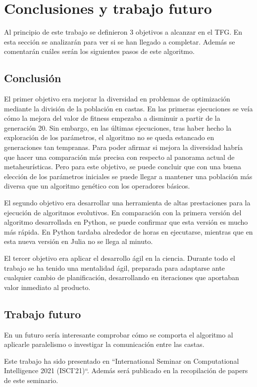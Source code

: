 \chapter{Conclusiones y trabajo futuro}

Al principio de este trabajo se definieron 3 objetivos a alcanzar en el TFG. En esta sección
se analizarán para ver si se han llegado a completar. Además se comentarán cuáles serán
los siguientes pasos de este algoritmo.

\section{Conclusión}

El primer objetivo era mejorar la diversidad en problemas de optimización mediante la división de la población en castas.
En las primeras ejecuciones se veía cómo la mejora del valor de fitness empezaba a disminuir a partir de la generación 20. Sin embargo,
en las últimas ejecuciones, tras haber hecho la exploración de los parámetros, el algoritmo no se queda estancado en generaciones
tan tempranas. Para poder afirmar si mejora la diversidad habría que hacer una comparación más precisa con respecto al panorama actual 
de metaheurísticas. Pero para este objetivo, se puede concluir que con una buena elección de los parámetros iniciales se 
puede llegar a mantener una población más diversa que un algoritmo genético con los operadores básicos.

El segundo objetivo era desarrollar una herramienta de altas prestaciones para la ejecución de algoritmos evolutivos. En comparación
con la primera versión del algoritmo desarrollada en Python, se puede confirmar que esta versión es mucho más rápida. En Python tardaba alrededor
de horas en ejecutarse, mientras que en esta nueva versión en Julia no se llega al minuto. 

El tercer objetivo era aplicar el desarrollo ágil en la ciencia. Durante todo el trabajo se ha tenido una mentalidad ágil, preparada para adaptarse ante 
cualquier cambio de planificación, desarrollando en iteraciones que aportaban valor inmediato al producto.

\section{Trabajo futuro}

En un futuro sería interesante comprobar cómo se comporta el algoritmo al aplicarle paralelismo o investigar la comunicación entre las castas. 

Este trabajo ha sido presentado en ``International Seminar on Computational Intelligence 2021 (ISCI'21)``. Además será publicado 
en la recopilación de papers de este seminario.